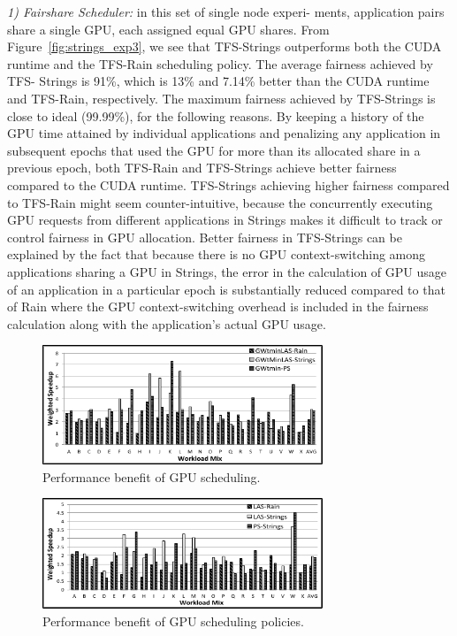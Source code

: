 \textit{1) Fairshare  Scheduler: } in  this  set  of single node experi- ments,  application  pairs  share  a  single  GPU,  each  assigned equal GPU shares. From Figure~\ref{fig:strings_exp3}, we see that TFS-Strings outperforms both the CUDA runtime and the TFS-Rain scheduling policy. The average fairness achieved by TFS- Strings is 91\%, which is 13\% and 7.14\% better than the CUDA runtime and TFS-Rain, respectively. The maximum fairness achieved by TFS-Strings is close to ideal  (99.99\%), for the following reasons. By keeping a history of the GPU time attained by individual applications and penalizing any application in subsequent epochs that used the GPU for more than its allocated share in a previous epoch, both TFS-Rain and TFS-Strings  achieve  better  fairness  compared  to  the CUDA runtime. TFS-Strings achieving higher fairness compared to TFS-Rain might seem counter-intuitive, because the concurrently executing GPU requests from different applications in  Strings  makes  it  difficult  to  track or control fairness in GPU allocation. Better fairness in TFS-Strings can be explained by the fact that because there is no GPU context-switching among applications sharing a GPU in Strings, the error in the calculation of GPU usage of an application in a particular epoch is substantially reduced compared to that of Rain where the GPU context-switching overhead is included in the fairness calculation along with the application’s actual GPU usage.
\begin{figure}[t]
\centering
\includegraphics[width=0.75\textwidth,height=\textheight,keepaspectratio]{figures/strings_exp4.pdf}
\caption{Performance benefit of GPU scheduling. }
\label{fig:strings_exp4}
\end{figure}
\begin{figure}[h]
\centering
\includegraphics[width=0.75\textwidth,height=\textheight,keepaspectratio]{figures/strings_exp5.pdf}
\caption{Performance benefit of GPU scheduling policies.}
\label{fig:strings_exp5}
\end{figure}

